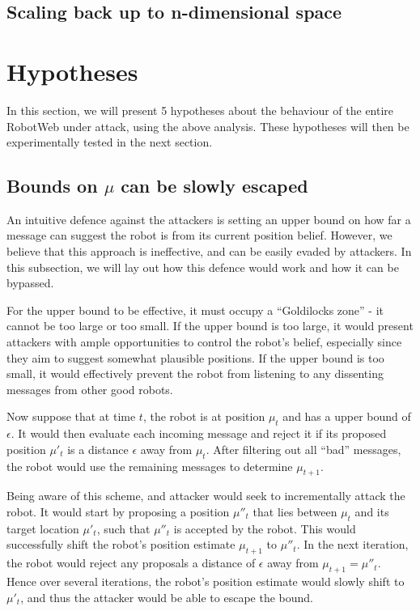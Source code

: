 \subsection{Scaling back up to n-dimensional space}

\section{Hypotheses}
In this section, we will present 5 hypotheses about the behaviour of the entire RobotWeb under attack, using the above analysis. These hypotheses will then be experimentally tested in the next section.

\subsection{Bounds on $\mu$ can be slowly escaped} \label{hyp:1}
An intuitive defence against the attackers is setting an upper bound on how far a message can suggest the robot is from its current position belief. 
However, we believe that this approach is ineffective, and can be easily evaded by attackers. In this subsection, we will lay out how this defence would work and how it can be bypassed.

For the upper bound to be effective, it must occupy a ``Goldilocks zone'' - it cannot be too large or too small. If the upper bound is too large, it would present attackers with ample opportunities to control the robot's belief, especially since they aim to suggest somewhat plausible positions.
If the upper bound is too small, it would effectively prevent the robot from listening to any dissenting messages from other good robots.

Now suppose that at time $t$, the robot is at position $\mu_t$ and has a upper bound of $\epsilon$. It would then evaluate each incoming message and reject it if its proposed position $\mu'_t$ is a distance $\epsilon$ away from $\mu_t$. After filtering out all ``bad'' messages, the robot would use the remaining messages to determine $\mu_{t+1}$. 

Being aware of this scheme, and attacker would seek to incrementally attack the robot. It would start by proposing a position $\mu''_t$ that lies between $\mu_t$ and its target location $\mu'_t$, such that $\mu''_t$ is accepted by the robot. This would successfully shift the robot's position estimate $\mu_{t+1}$ to $\mu''_t$. In the next iteration, the robot would reject any proposals a distance of $\epsilon$ away from $\mu_{t+1} = \mu''_t$. Hence over several iterations, the robot's position estimate would slowly shift to $\mu'_t$, and thus the attacker would be able to escape the bound.

